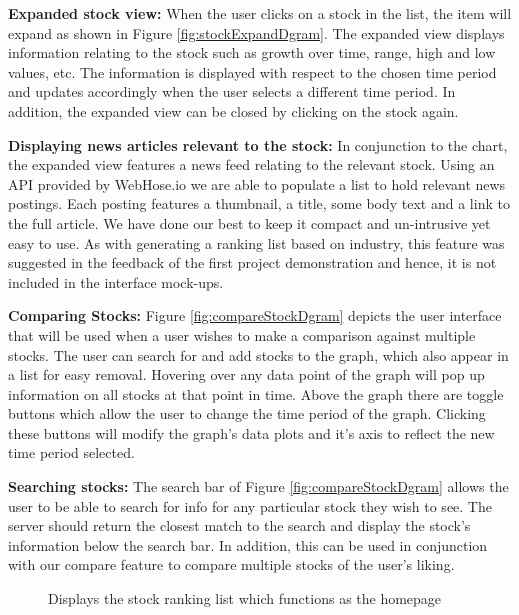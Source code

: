\documentclass[11pt]{article}
\numberwithin{figure}{section}
\begin{document}
    \bigskip
    \noindent
    {\bfseries Expanded stock view:} When the user clicks on a stock in the list, the item will expand as shown in Figure \ref{fig:stockExpandDgram}. The expanded view displays information relating to the stock such as growth over time, range, high and low values, etc. The information is displayed with respect to the chosen time period and updates accordingly when the user selects a different time period. In addition, the expanded view can be closed by clicking on the stock again.
    
    \bigskip
    \noindent
    {\bfseries Displaying news articles relevant to the stock:} In conjunction to the chart, the expanded view features a news feed relating to the relevant stock. Using an API provided by WebHose.io we are able to populate a list to hold relevant news postings. Each posting features a thumbnail, a title, some body text and a link to the full article. We have done our best to keep it compact and un-intrusive yet easy to use.  As with generating a ranking list based on industry, this feature was suggested in the feedback of the first project demonstration and hence, it is not included in the interface mock-ups.
  

    \bigskip
    \noindent
    {\bfseries Comparing Stocks:} Figure \ref{fig:compareStockDgram} depicts the user interface that will be used when a user wishes to make a comparison against multiple stocks. The user can search for and add stocks to the graph, which also appear in a list for easy removal. Hovering over any data point of the graph will pop up information on all stocks at that point in time. Above the graph there are toggle buttons which allow the user to change the time period of the graph. Clicking these buttons will modify the graph’s data plots and it’s axis to reflect the new time period selected.

    \bigskip
    \noindent
    {\bfseries Searching stocks:} The search bar of Figure \ref{fig:compareStockDgram} allows the user to be able to search for info for any particular stock they wish to see. The server should return the closest match to the search and display the stock’s information below the search bar. In addition, this can be used in conjunction with our compare feature to compare multiple stocks of the user’s liking.
    
    \begin{figure}[htp]
        \centering
        \caption{Displays the stock ranking list which functions as the homepage}
        \label{fig:rankListDgram}
    \end{figure}
    
\end{document}
